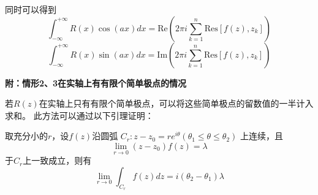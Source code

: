 \documentclass[a4paper,12pt]{article}
\begin{document}
同时可以得到
$$
\int_{-\infty}^{+\infty}R\left(x\right)\cos\left(ax\right)dx=
\text{Re}\left(2\pi i\sum_{k=1}^n\text{Res}\left[f\left(z\right),z_k\right]\right)
$$
$$
\int_{-\infty}^{+\infty}R\left(x\right)\sin\left(ax\right)dx=
\text{Im}\left(2\pi i\sum_{k=1}^n\text{Res}\left[f\left(z\right),z_k\right]\right)
$$

\noindent
\textbf{附：情形2、3在实轴上有有限个简单极点的情况}

若$R\left(z\right)$在实轴上只有有限个简单极点，可以将这些简单极点的留数值的一半计入求和。
此方法可以通过以下引理证明：

取充分小的$r$，设$f\left(z\right)$沿圆弧
$C_r:z-z_0=re^{i\theta}\left(\theta_1\le\theta\le\theta_2\right)$
上连续，且
$$
\lim_{r\to0}\left(z-z_0\right)f\left(z\right)=\lambda
$$
于$C_r$上一致成立，则有
$$
\lim_{r\to0}\int_{C_r}f\left(z\right)dz=i\left(\theta_2-\theta_1\right)\lambda
$$
\end{document}
